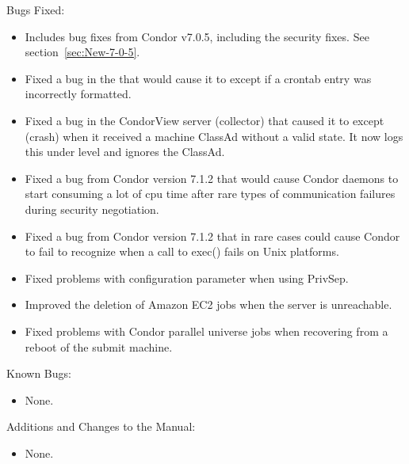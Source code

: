 \noindent Bugs Fixed:

\begin{itemize}

\item Includes bug fixes from Condor v7.0.5, including the security fixes.
	See section~\ref{sec:New-7-0-5}.

\item Fixed a bug in the  that would cause it to
except if a crontab entry was incorrectly formatted.

\item Fixed a bug in the CondorView server (collector) that caused it
to except (crash) when it received a machine ClassAd without a valid state.
It now logs this under level  and ignores the ClassAd.

\item Fixed a bug from Condor version 7.1.2 that would cause 
Condor daemons to start
consuming a lot of cpu time after rare types of communication failures
during security negotiation.

\item Fixed a bug from Condor version 7.1.2 that in rare cases could cause
Condor to fail to recognize when a call to exec() fails on Unix
platforms.

\item Fixed problems with configuration parameter
 when using PrivSep.

\item Improved the deletion of Amazon EC2 jobs when the server is
unreachable.

\item Fixed problems with Condor parallel universe jobs when recovering from
	a reboot of the submit machine.

\end{itemize}

\noindent Known Bugs:

\begin{itemize}

\item None.

\end{itemize}

\noindent Additions and Changes to the Manual:

\begin{itemize}

\item None.

\end{itemize}

